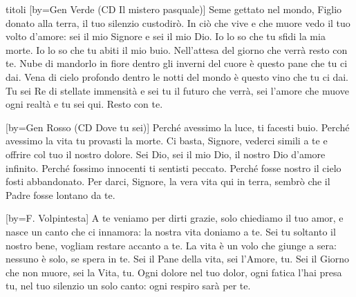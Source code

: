 \begin{songs}{titoli}
[by={Gen Verde (CD Il mistero pasquale)}]
\beginverse
Seme gettato nel mondo,
Figlio donato alla terra,
il tuo silenzio custodirò.
In ciò che vive e che muore
vedo il tuo volto d'amore:
sei il mio Signore e sei il mio Dio.
\endverse
\beginchorus
Io lo so che tu sfidi la mia morte.
Io lo so che tu abiti il mio buio.
Nell'attesa del giorno che verrà
resto con te.
\endchorus
\beginverse
Nube di mandorlo in fiore
dentro gli inverni del cuore
è questo pane che tu ci dai.
Vena di cielo profondo
dentro le notti del mondo
è questo vino che tu ci dai.
\endverse
\beginverse*
Tu sei Re di stellate immensità
e sei tu il futuro che verrà,
sei l'amore che muove ogni realtà
e tu sei qui.
Resto con te.
\endverse
\endsong

[by={Gen Rosso (CD Dove tu sei)}]
\beginverse
Perché avessimo la luce, ti facesti buio.
Perché avessimo la vita tu provasti la morte.
Ci basta, Signore, vederci simili a te
e offrire col tuo il nostro dolore.
\endverse
\beginchorus
Sei Dio, sei il mio Dio,
il nostro Dio
d'amore infinito. 
\endchorus
\beginverse
Perché fossimo innocenti ti sentisti peccato.
Perché fosse nostro il cielo fosti abbandonato.
Per darci, Signore, la vera vita qui in terra,
sembrò che il Padre fosse lontano da te.
\endverse
\endsong

[by={F. Volpintesta}]
\beginverse
A te veniamo per dirti grazie,
solo chiediamo il tuo amor,
e nasce un canto che ci innamora:
la nostra vita doniamo a te.
Sei tu soltanto il nostro bene,
vogliam restare accanto a te.
La vita è un volo che giunge a sera:
nessuno è solo, se spera in te.
\endverse
\beginchorus
Sei il Pane della vita, sei l'Amore, tu.
Sei il Giorno che non muore, sei la Vita, tu.
\endchorus
\beginverse
Ogni dolore nel tuo dolor,
ogni fatica l'hai presa tu,
nel tuo silenzio un solo canto:
ogni respiro sarà per te.
\endverse
\endsong


\end{songs}
